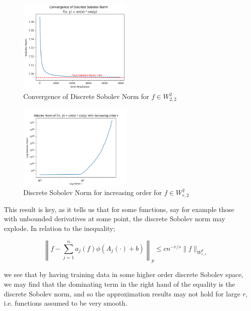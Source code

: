 \documentclass[11pt,a4paper]{article}
\theoremstyle{plain}
\theoremstyle{definition}
\theoremstyle{remark}
\begin{document}
\begin{figure}[h]
    \centering
    \includegraphics[width=0.5\textwidth]{diags/convergence.png}
    \caption{Convergence of Discrete Sobolev Norm for \(f \in W^{2}_{2,2}\) }
    \label{fig:order}
\end{figure}
\begin{figure}[h]
    \centering
    \includegraphics[width=0.5\textwidth]{diags/SobolevNormIncreasingOrder.png}
    \caption{Discrete Sobolev Norm for increasing order for \(f \in W^{2}_{r,2}\) }
    \label{fig:order}
\end{figure}

This result is key, as it tells us that for some functions, say for example those with unbounded derivatives at some point, the discrete Sobolev norm may explode. In relation to the inequality;

    \[ \left\|f - \sum_{j=1}^{n} a_j(f) \phi(A_j(\cdot) + b)\right\|_p \leq c n^{-r/s} \|f\|_{W^p_{r,s}} \]

we see that by having training data in some higher order discrete Sobolev space, we may find that the dominating term in the right hand of the equality is the discrete Sobolev norm, and so the approximation results may not hold for large \(r\), i.e. functions assumed to be very smooth.
\end{document}
